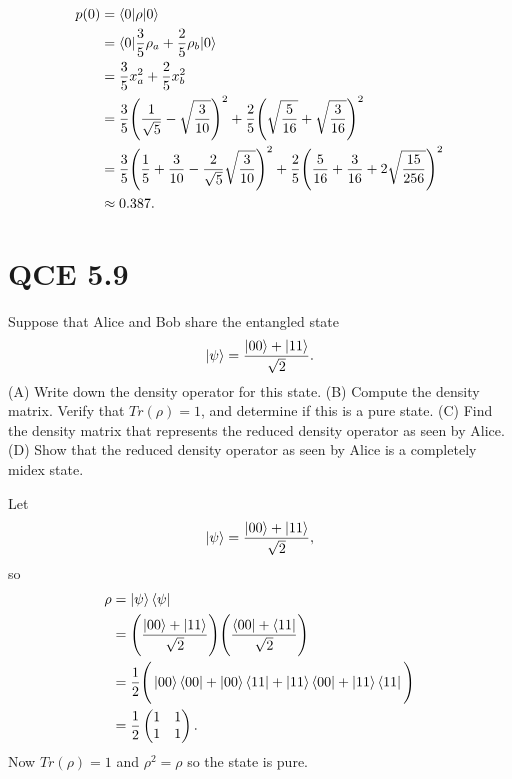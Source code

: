 \documentclass[10pt]{article}
\begin{document}
\begin{align*}
p(0) &=  \braket{ 0 | \rho | 0} \\
       &= \braket{ 0 | \frac{3}{5} \rho_a + \frac{2}{5} \rho_b | 0 }\\
       &= \frac{3}{5} x_a^2 + \frac{2}{5} x_b^2 \\
       &= \frac{3}{5} \Bigg( \frac{1}{\sqrt{5}} - \sqrt{\frac{3}{10}} \Bigg)^2 + \frac{2}{5} \Bigg( \sqrt{\frac{5}{16}} + \sqrt{\frac{3}{16}} \Bigg)^2 \\
       &= \frac{3}{5} \Bigg( \frac{1}{5} + \frac{3}{10} - \frac{2}{\sqrt{5}} \sqrt{\frac{3}{10}} \Bigg)^2 + \frac{2}{5} \Bigg( \frac{5}{16} + \frac{3}{16} + 2\sqrt{\frac{15}{256}} \Bigg)^2 \\
       &\approx 0.387.
\end{align*}

\section*{QCE 5.9}
\color{blue} 
Suppose that Alice and Bob share the entangled state
\[
\ket{\psi} = \frac{\ket{00} + \ket{11}}{\sqrt{2}}.
\]
(A) Write down the density operator for this state.
(B) Compute the density matrix. Verify that $Tr(\rho) = 1$, and determine if this is a pure state.
(C) Find the density matrix that represents the reduced density operator as seen by Alice.
(D) Show that the reduced density operator as seen by Alice is a completely midex state.
\color{black}

Let 
\[
\ket{\psi} = \frac{\ket{00} + \ket{11}}{\sqrt{2}},
\]
so 
\begin{align*}
\rho &= \ket{\psi} \bra{\psi} \\
        & = \Bigg( \frac{\ket{00} + \ket{11}}{\sqrt{2}} \Bigg)  \Bigg( \frac{\bra{00} + \bra{11}}{\sqrt{2}} \Bigg) \\
        &= \frac{1}{2} \Bigg(  \ket{00} \bra{00} + \ket{00} \bra{11} + \ket{11} \bra{00} + \ket{11} \bra{11} \Bigg) \\
        &= \frac{1}{2}
        \begin{pmatrix}
		1 & 1 \\
		1 & 1        
        \end{pmatrix}.
\end{align*}
Now $Tr(\rho) = 1$ and $\rho^2 = \rho$ so the state is pure.
\end{document}
